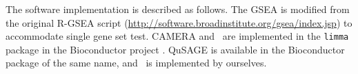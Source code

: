 	
	The software implementation is described as follows. The GSEA is modified from the original 
	R-GSEA script (\url{http://software.broadinstitute.org/gsea/index.jsp}) to accommodate single 
	gene set test.
	CAMERA and \genr~are implemented in the \verb|limma| package \citep{smyth2005limma} in the 
	Bioconductor
	project \citep{gentleman2004bioconductor}. QuSAGE is available in the Bioconductor package of 
	the
	same name, and \gent~is implemented by ourselves. 
	

	
	
	
